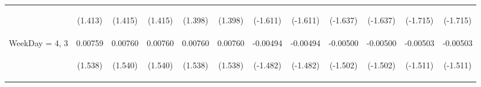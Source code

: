 \documentclass[]{article}
\begin{document}
\begin{center}
\begin{tabular}{lccccccccccc}
\vspace{4pt} & \begin{footnotesize}(1.413)\end{footnotesize} & \begin{footnotesize}(1.415)\end{footnotesize} & \begin{footnotesize}(1.415)\end{footnotesize} & \begin{footnotesize}(1.398)\end{footnotesize} & \begin{footnotesize}(1.398)\end{footnotesize} & \begin{footnotesize}(-1.611)\end{footnotesize} & \begin{footnotesize}(-1.611)\end{footnotesize} & \begin{footnotesize}(-1.637)\end{footnotesize} & \begin{footnotesize}(-1.637)\end{footnotesize} & \begin{footnotesize}(-1.715)\end{footnotesize} & \begin{footnotesize}(-1.715)\end{footnotesize} \\
WeekDay = 4, 3 & 0.00759 & 0.00760 & 0.00760 & 0.00760 & 0.00760 & -0.00494 & -0.00494 & -0.00500 & -0.00500 & -0.00503 & -0.00503 \\
\vspace{4pt} & \begin{footnotesize}(1.538)\end{footnotesize} & \begin{footnotesize}(1.540)\end{footnotesize} & \begin{footnotesize}(1.540)\end{footnotesize} & \begin{footnotesize}(1.538)\end{footnotesize} & \begin{footnotesize}(1.538)\end{footnotesize} & \begin{footnotesize}(-1.482)\end{footnotesize} & \begin{footnotesize}(-1.482)\end{footnotesize} & \begin{footnotesize}(-1.502)\end{footnotesize} & \begin{footnotesize}(-1.502)\end{footnotesize} & \begin{footnotesize}(-1.511)\end{footnotesize} & \begin{footnotesize}(-1.511)\end{footnotesize} \\

\end{tabular}
\end{center}
\end{document}
